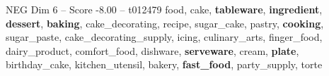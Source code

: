 \begin{textsample}{NEG Dim 6 – Score -8.00 – t012479}  \label{ex:f6_neg_032}
food, cake, \textbf{tableware}, \textbf{ingredient}, \textbf{dessert}, \textbf{baking}, cake\_decorating, recipe, sugar\_cake, pastry, \textbf{cooking}, sugar\_paste, cake\_decorating\_supply, icing, culinary\_arts, finger\_food, dairy\_product, comfort\_food, dishware, \textbf{serveware}, cream, \textbf{plate}, birthday\_cake, kitchen\_utensil, bakery, \textbf{fast\_food}, party\_supply, torte

\end{textsample}
